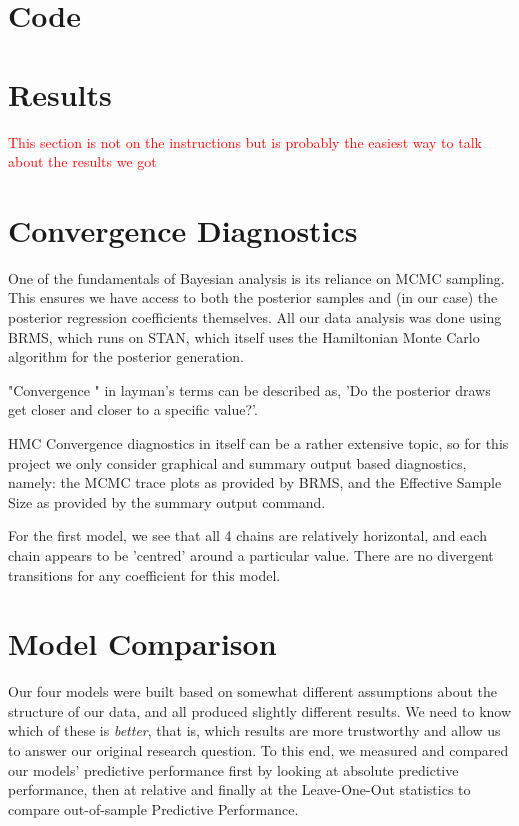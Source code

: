 \documentclass[12pt]{article}
\begin{document}
\section{Code}


\section{Results}

\textcolor{red}{This section is not on the instructions but is probably the easiest way to talk about the results we got }




\section{Convergence Diagnostics}

One of the fundamentals of Bayesian analysis is its reliance on MCMC sampling. This ensures we have access to both the posterior samples and (in our case) the posterior regression coefficients themselves. All our data analysis was done using BRMS, which runs on STAN, which itself uses the Hamiltonian Monte Carlo algorithm for the posterior generation. 

"Convergence " in layman's terms can be described as, 'Do the posterior draws get closer and closer to a specific value?'.

HMC Convergence diagnostics in itself can be a rather extensive topic, so for this project we only consider graphical and summary output based diagnostics, namely: the MCMC trace plots as provided by BRMS, and the Effective Sample Size as provided by the summary output command.

For the first model, we see that all 4 chains are relatively horizontal, and each chain appears to be 'centred' around a particular value. There are no divergent transitions for any coefficient for this model. 

\section{Model Comparison}


Our four models were built based on somewhat different assumptions about the structure of our data, and all produced slightly different results. We need to know which of these is \textit{better}, that is, which results are more trustworthy and allow us to answer our original research question.
To this end, we measured and compared our models' predictive performance first by looking at absolute predictive performance, then at relative and finally at the Leave-One-Out statistics to compare out-of-sample Predictive Performance.
\end{document}
